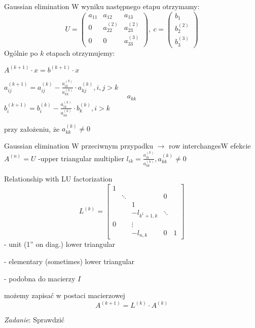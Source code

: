 \begin{frame}{Gaussian elimination}
W wyniku następnego etapu otrzymamy:
$$
U = \left(\begin{array}{lll}
a_{11} & a_{12} & a_{13}\\
0 & a_{22}^{(2)} &a_{23}^{(2)}\\
0 & 0 & a_{33}^{(3)}
\end{array}\right)
,\ c=\left(\begin{array}{l}
b_{1}\\
b_{2}^{(2)}\\
b_{3}^{(3)}
\end{array}\right)
$$
Ogólnie po $k$ etapach otrzymujemy:
\begin{flushright}
$
A^{(k+1)}\cdot x=b^{(k+1)}\cdot x
$

$a_{ij}^{(k+1)}=a_{ij}^{(k)}-\displaystyle \frac{a_{ik}^{(k)}}{a_{kk}^{(k)}}\cdot a_{kj}^{(k)}, i, j>k$ 
$$
a_{kk}
$$
$b_{i}^{(k+1)}=b_{i}^{(k)}-\displaystyle \frac{a_{ik}^{(k)}}{a_{kk}^{(k)}}\cdot b_{k}^{(k)}, i>k$ 
\end{flushright}
przy założeniu, że $a_{kk}^{(k)}\neq 0$

\end{frame}
\begin{frame}{Gaussian elimination}
W przeciwnym przypadku $\rightarrow$ row interchanges\newline W efekcie $A^{(n)}=U$ -upper triangular multiplier $l_{ik}=\displaystyle \frac{a_{ik}^{(k)}}{a_{kk}^{(k)}}, a_{kk}^{(k)}\neq 0$
\end{frame}
\begin{frame}{Relationship with LU factorization}
$$
L^{(k)}=\begin{bmatrix}
1 \\
 & \ddots & & 0 \\
 & & 1\\
 & &   -l_{k^{1}+1,k}  & \ddots\\
 0 & &  \vdots \\
 & & -l_{n,k} &  0  & 1

\end{bmatrix}
$$
- unit (1'' on diag.) lower triangular

- elementary (sometimes) lower triangular

- podobna do macierzy $I$

 możemy zapisać w postaci macierzowej
$$
A^{(k+1)}=L^{(k)}\cdot A^{(k)}
$$
\begin{flushright}
{\it Zadanie}: Sprawdzić
\end{flushright}


\end{frame}

